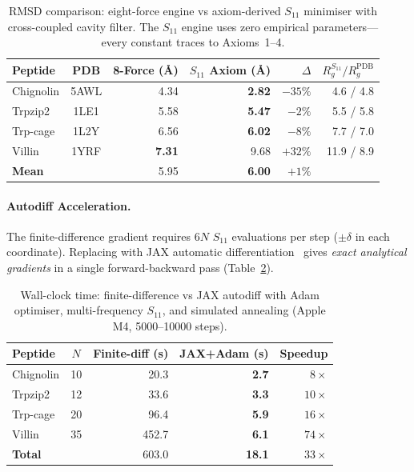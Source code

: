 \begin{table}[H]
\centering
\caption{RMSD comparison: eight-force engine vs axiom-derived $S_{11}$ minimiser with cross-coupled cavity filter.  The $S_{11}$ engine uses zero empirical parameters---every constant traces to Axioms~1--4.}
\label{tab:s11_comparison}
\small
\begin{tabular}{@{}l c r r r r@{}}
\toprule
\textbf{Peptide} & \textbf{PDB} & \textbf{8-Force ({\AA})} & \textbf{$S_{11}$ Axiom ({\AA})} & \textbf{$\Delta$} & $R_g^{S_{11}} / R_g^{\text{PDB}}$ \\
\midrule
Chignolin  & 5AWL & 4.34 & \textbf{2.82} & $-35\%$ & 4.6 / 4.8 \\
Trpzip2    & 1LE1 & 5.58 & \textbf{5.47} & $-2\%$  & 5.5 / 5.8 \\
Trp-cage   & 1L2Y & 6.56 & \textbf{6.02} & $-8\%$  & 7.7 / 7.0 \\
Villin     & 1YRF & \textbf{7.31} & 9.68      & $+32\%$ & 11.9 / 8.9 \\
\midrule
\textbf{Mean} & & 5.95 & \textbf{6.00} & $+1\%$ & \\
\bottomrule
\end{tabular}
\end{table}

\paragraph{Autodiff Acceleration.}
The finite-difference gradient requires $6N$ $S_{11}$ evaluations per step ($\pm\delta$ in each coordinate). Replacing with JAX automatic differentiation~\cite{jax2018} gives \emph{exact analytical gradients} in a single forward-backward pass (Table~\ref{tab:autodiff}).

\begin{table}[H]
\centering
\caption{Wall-clock time: finite-difference vs JAX autodiff with Adam optimiser, multi-frequency $S_{11}$, and simulated annealing (Apple M4, 5000--10000 steps).}
\label{tab:autodiff}
\small
\begin{tabular}{@{}l c r r r@{}}
\toprule
\textbf{Peptide} & $N$ & \textbf{Finite-diff (s)} & \textbf{JAX+Adam (s)} & \textbf{Speedup} \\
\midrule
Chignolin  & 10 & 20.3  & \textbf{2.7}  & $8\times$ \\
Trpzip2    & 12 & 33.6  & \textbf{3.3}  & $10\times$ \\
Trp-cage   & 20 & 96.4  & \textbf{5.9}  & $16\times$ \\
Villin     & 35 & 452.7 & \textbf{6.1}  & $74\times$ \\
\midrule
\textbf{Total} & & 603.0 & \textbf{18.1} & $33\times$ \\
\bottomrule
\end{tabular}
\end{table}

